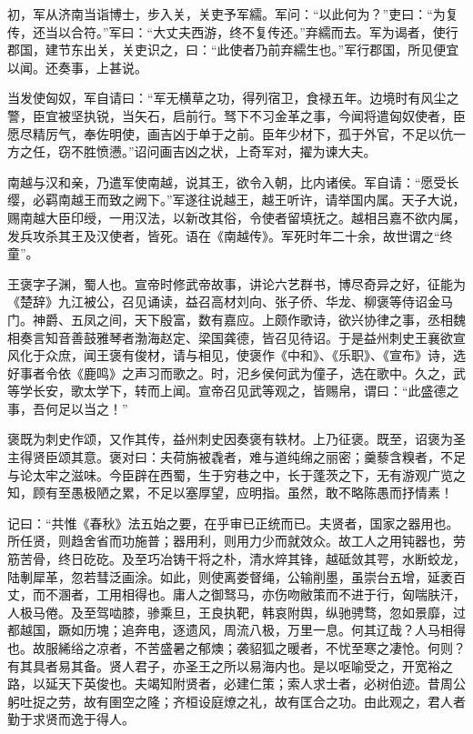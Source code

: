 \documentclass[12pt,UTF8]{ctexbook}
\begin{document}
初，军从济南当诣博士，步入关，关吏予军繻。军问：“以此何为？”吏曰：“为复传，还当以合符。”军曰：“大丈夫西游，终不复传还。”弃繻而去。军为谒者，使行郡国，建节东出关，关吏识之，曰：“此使者乃前弃繻生也。”军行郡国，所见便宜以闻。还奏事，上甚说。



当发使匈奴，军自请曰：“军无横草之功，得列宿卫，食禄五年。边境时有风尘之警，臣宜被坚执锐，当矢石，启前行。驽下不习金革之事，今闻将遣匈奴使者，臣愿尽精厉气，奉佐明使，画吉凶于单于之前。臣年少材下，孤于外官，不足以伉一方之任，窃不胜愤懑。”诏问画吉凶之状，上奇军对，擢为谏大夫。



南越与汉和亲，乃遣军使南越，说其王，欲令入朝，比内诸侯。军自请：“愿受长缨，必羁南越王而致之阙下。”军遂往说越王，越王听许，请举国内属。天子大说，赐南越大臣印绶，一用汉法，以新改其俗，令使者留填抚之。越相吕嘉不欲内属，发兵攻杀其王及汉使者，皆死。语在《南越传》。军死时年二十余，故世谓之“终童”。



王褒字子渊，蜀人也。宣帝时修武帝故事，讲论六艺群书，博尽奇异之好，征能为《楚辞》九江被公，召见诵读，益召高材刘向、张子侨、华龙、柳褒等侍诏金马门。神爵、五凤之间，天下殷富，数有嘉应。上颇作歌诗，欲兴协律之事，丞相魏相奏言知音善鼓雅琴者渤海赵定、梁国龚德，皆召见待诏。于是益州刺史王襄欲宣风化于众庶，闻王褒有俊材，请与相见，使褒作《中和》、《乐职》、《宣布》诗，选好事者令依《鹿鸣》之声习而歌之。时，汜乡侯何武为僮子，选在歌中。久之，武等学长安，歌太学下，转而上闻。宣帝召见武等观之，皆赐帛，谓曰：“此盛德之事，吾何足以当之！”



褒既为刺史作颂，又作其传，益州刺史因奏褒有轶材。上乃征褒。既至，诏褒为圣主得贤臣颂其意。褒对曰：夫荷旃被毳者，难与道纯绵之丽密；羹藜含糗者，不足与论太牢之滋味。今臣辟在西蜀，生于穷巷之中，长于蓬茨之下，无有游观广览之知，顾有至愚极陋之累，不足以塞厚望，应明指。虽然，敢不略陈愚而抒情素！



记曰：“共惟《春秋》法五始之要，在乎审已正统而已。夫贤者，国家之器用也。所任贤，则趋舍省而功施普；器用利，则用力少而就效众。故工人之用钝器也，劳筋苦骨，终日矻矻。及至巧冶铸干将之朴，清水焠其锋，越砥敛其咢，水断蛟龙，陆剸犀革，忽若彗泛画涂。如此，则使离娄督绳，公输削墨，虽崇台五增，延袤百丈，而不溷者，工用相得也。庸人之御驽马，亦伤吻敝策而不进于行，匈喘肤汗，人极马倦。及至驾啮膝，骖乘旦，王良执靶，韩哀附舆，纵驰骋骛，忽如景靡，过都越国，蹶如历塊；追奔电，逐遗风，周流八极，万里一息。何其辽哉？人马相得也。故服絺绤之凉者，不苦盛暑之郁燠；袭貂狐之暖者，不忧至寒之凄怆。何则？有其具者易其备。贤人君子，亦圣王之所以易海内也。是以呕喻受之，开宽裕之路，以延天下英俊也。夫竭知附贤者，必建仁策；索人求士者，必树伯迹。昔周公躬吐捉之劳，故有圉空之隆；齐桓设庭燎之礼，故有匡合之功。由此观之，君人者勤于求贤而逸于得人。
\end{document}
